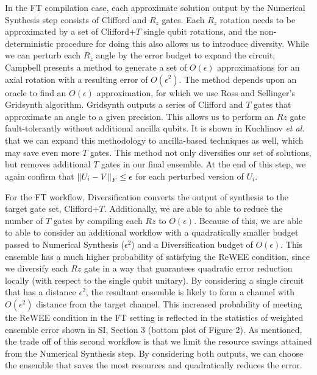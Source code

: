 In the FT compilation case, each approximate solution output by the Numerical Synthesis step consists of Clifford and $R_z$ gates. Each $R_z$ rotation needs to be approximated by a set of Clifford+$T$ single qubit rotations, and the non-deterministic procedure for doing this also allows us to introduce diversity. While we can perturb each $R_z$ angle by the error budget to expand the circuit, Campbell \cite{PhysRevA.95.042306} presents a method to generate a set of $O(\epsilon)$ approximations for an axial rotation with a resulting error of $O(\epsilon^2)$. The method depends upon an oracle to find an $O(\epsilon)$ approximation, for which we use Ross and Sellinger's Gridsynth\cite{ross_sellinger} algorithm. Gridsynth outputs a series of Clifford and $T$ gates that approximate an angle to a given precision. This allows us to perform an $Rz$ gate fault-tolerantly without additional ancilla qubits. It is shown in Kuchlinov \emph{et al.} \cite{Kliuchnikov_2023} that we can expand this methodology to ancilla-based techniques as well, which may save even more $T$ gates. This method not only diversifies our set of solutions, but removes additional $T$ gates in our final ensemble. At the end of this step, we again confirm that $\left\lVert U_i-V \right\rVert_F \leq \epsilon$ for each perturbed version of $U_i$.

For the FT workflow, Diversification converts the output of synthesis to the target gate set, Clifford+$T$. Additionally, we are able to able to reduce the number of $T$ gates by compiling each $Rz$ to $O(\epsilon)$. Because of this, we are able to able to consider an additional workflow with a quadratically smaller budget passed to Numerical Synthesis ($\epsilon^2$) and a Diversification budget of $O(\epsilon)$. This ensemble has a much higher probability of satisfying the ReWEE condition, since we diversify each $Rz$ gate in a way that guarantees quadratic error reduction locally (with respect to the single qubit unitary). By considering a single circuit that has a distance $\epsilon^2$, the resultant ensemble is likely to form a channel with $O(\epsilon^2)$ distance from the target channel. This increased probability of meeting the ReWEE condition in the FT setting is reflected in the statistics of weighted ensemble error shown in SI, Section 3 (bottom plot of Figure 2). As mentioned, the trade off of this second workflow is that we limit the resource savings attained from the Numerical Synthesis step. By considering both outputs, we can choose the ensemble that saves the most resources and quadratically reduces the error.


